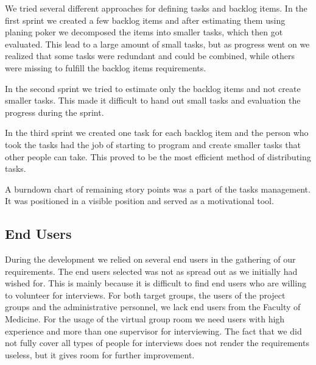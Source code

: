 We tried several different approaches for defining tasks and backlog items. 
In the first sprint we created a few backlog items and after estimating them using planing poker we decomposed the items into smaller tasks, which then got evaluated. 
This lead to a large amount of small tasks, but as progress went on we realized that some tasks were redundant and could be combined, while others were missing to fulfill the backlog items requirements. 

In the second sprint we tried to estimate only the backlog items and not create smaller tasks. 
This made it difficult to hand out small tasks and evaluation the progress during the sprint. 

In the third sprint we created one task for each backlog item and the person who took the tasks had the job of starting to program and create smaller tasks that other people can take. 
This proved to be the most efficient method of distributing tasks.

A burndown chart of remaining story points was a part of the tasks management.
It was positioned in a visible position and served as a motivational tool.


\subsection{End Users}
During the development we relied on several end users in the gathering of our requirements.
The end users selected was not as spread out as we initially had wished for. 
This is mainly because it is difficult to find end users who are willing to volunteer for interviews. 
For both target groups, the users of the project groups and the administrative personnel, we lack end users from the Faculty of Medicine.
For the usage of the virtual group room we need users with high experience and more than one supervisor for interviewing. 
The fact that we did not fully cover all types of people for interviews does not render the requirements useless, but it gives room for further improvement.